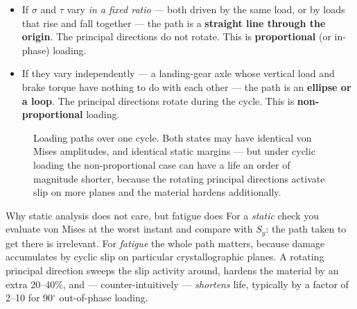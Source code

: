 \documentclass[11pt,a4paper]{article}
\begin{document}
\begin{itemize}[nosep]
  \item If $\sigma$ and $\tau$ vary \emph{in a fixed ratio} --- both driven by the same load, or by loads that rise and fall together --- the path is a \textbf{straight line through the origin}. The principal directions do not rotate. This is \textbf{proportional} (or in-phase) loading.
  \item If they vary independently --- a landing-gear axle whose vertical load and brake torque have nothing to do with each other --- the path is an \textbf{ellipse or a loop}. The principal directions rotate during the cycle. This is \textbf{non-proportional} loading.
\end{itemize}

\begin{figure}[H]\centering
{}
\caption{Loading paths over one cycle. Both states may have identical von Mises amplitudes, and identical static margins --- but under cyclic loading the non-proportional case can have a life an order of magnitude shorter, because the rotating principal directions activate slip on more planes and the material hardens additionally.}
\label{fig:prop}
\end{figure}

\begin{keybox}{Why static analysis does not care, but fatigue does}
For a \emph{static} check you evaluate von Mises at the worst instant and compare with $S_y$: the path taken to get there is irrelevant. For \emph{fatigue} the whole path matters, because damage accumulates by cyclic slip on particular crystallographic planes. A rotating principal direction sweeps the slip activity around, hardens the material by an extra 20--40\%, and --- counter-intuitively --- \emph{shortens} life, typically by a factor of 2--10 for 90$^\circ$ out-of-phase loading.
\end{keybox}
\end{document}
